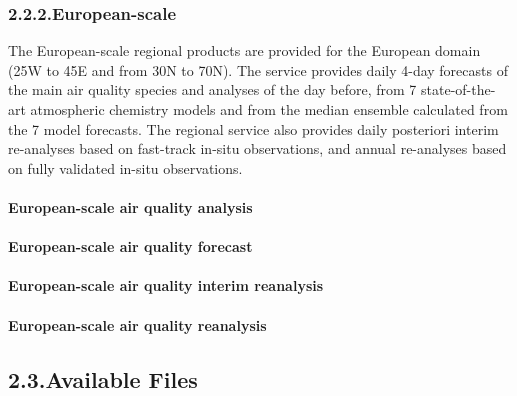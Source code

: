\documentclass[9pt]{report}
\begin{document}
\subsubsection{2.2.2.\hspace*{0.5em}European-scale}\label{sec-european-scale}%

\noindent{}The European-scale regional products are provided for the European domain (25\textdegree{}W to 45\textdegree{}E and from 30\textdegree{}N to 70\textdegree{}N). 
The service provides daily 4-day forecasts of the main air quality species and analyses of the day before, from 7 state-of-the-art atmospheric chemistry models and from the median ensemble calculated from the 7 model forecasts. 
The regional service also provides daily posteriori interim re-analyses based on fast-track in-situ observations, and annual re-analyses based on fully validated in-situ observations.%

\paragraph{European-scale air quality analysis}\label{sec-european-scale-air-quality-analysis}%

\paragraph{European-scale air quality forecast}\label{sec-european-scale-air-quality-forecast}%

\paragraph{European-scale air quality interim reanalysis}\label{sec-european-scale-air-quality-interim-reanalysis}%

\paragraph{European-scale air quality reanalysis}\label{sec-european-scale-air-quality-reanalysis}%

\subsection{2.3.\hspace*{0.5em}Available Files}\label{sec-available-files}%
\end{document}
